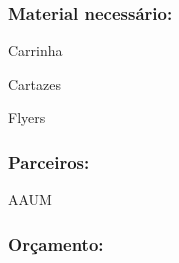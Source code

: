 \subsubsection*{Material necessário:}
\begin{itemizedash}
	\item{Carrinha}
	\item{Cartazes}
	\item{Flyers}
\end{itemizedash}

\subsubsection*{Parceiros:}
\begin{itemizedash}
	\item{AAUM}
\end{itemizedash}

\subsubsection*{Orçamento:}


